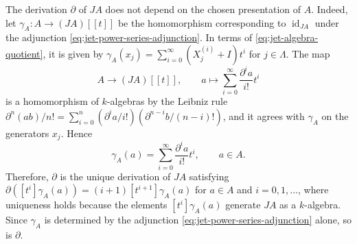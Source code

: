 \documentclass[a4paper, 12pt, reqno]{amsart}
\theoremstyle{remark}
\begin{document}
The derivation $\partial$ of $J A$ does not depend on the chosen presentation of $A$.
Indeed, let $\gamma_A \colon A \to (J A)[[t]]$ be the homomorphism corresponding to $\operatorname{id}_{J A}$ under the adjunction \eqref{eq:jet-power-series-adjunction}.
In terms of \eqref{eq:jet-algebra-quotient}, it is given by $\gamma_A(x_j) = \sum_{i = 0}^\infty (X_j^{(i)} + I)t^i$ for $j \in \Lambda$.
The map
\begin{equation*}
  A \to (J A)[[t]], \qquad a \mapsto \sum_{i = 0}^\infty \frac{\partial^ia}{i!}t^i
\end{equation*}
is a homomorphism of $k$-algebras by the Leibniz rule $\partial^n(ab)/n! = \sum_{i = 0}^n (\partial^ia/i!)(\partial^{n - i}b/(n - i)!)$, and it agrees with $\gamma_A$ on the generators $x_j$.
Hence
\begin{equation*}
  \gamma_A(a) = \sum_{i = 0}^\infty \frac{\partial^ia}{i!}t^i, \qquad a \in A.
\end{equation*}
Therefore, $\partial$ is the unique derivation of $J A$ satisfying $\partial([t^i]\gamma_A(a)) = (i + 1)[t^{i + 1}]\gamma_A(a)$ for $a \in A$ and $i = 0, 1, \dots$, where uniqueness holds because the elements $[t^i]\gamma_A(a)$ generate $J A$ as a $k$-algebra.
Since $\gamma_A$ is determined by the adjunction \eqref{eq:jet-power-series-adjunction} alone, so is $\partial$.
\end{document}
